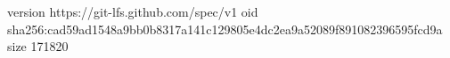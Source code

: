 version https://git-lfs.github.com/spec/v1
oid sha256:cad59ad1548a9bb0b8317a141c129805e4dc2ea9a52089f891082396595fcd9a
size 171820

